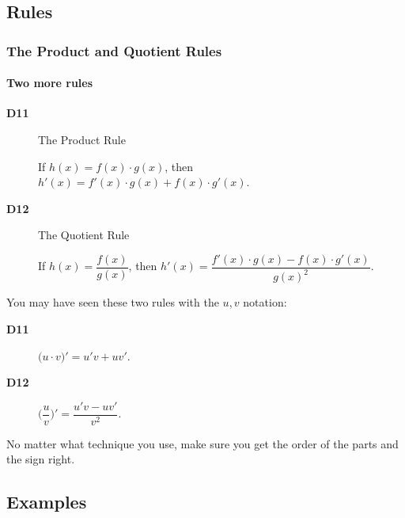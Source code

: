 \documentclass[9pt,xcolor=x11names,compress]{beamer}
\begin{document}
\subsection{Rules}
\begin{frame}\frametitle{The Product and Quotient Rules}
\framesubtitle{Two more rules}
\begin{description}
\item[\textbf{D11}] \alert{The Product Rule}

If $h(x)=f(x)\cdot g(x)$, then $h'(x)=f'(x)\cdot g(x) + f(x)\cdot g'(x)$.
\item[\textbf{D12}] \alert{The Quotient Rule} 

If $h(x)=\dfrac{f(x)}{g(x)}$, then $h'(x)=\dfrac{f'(x)\cdot g(x) - f(x)\cdot g'(x)}{g(x)^2}$.
\end{description}
\pause You may have seen these two rules with the $u,v$ notation:
\begin{description}
	\item[\textbf{D11}] $\big( u\cdot v \big)' = u' v + u v'$.
	\item[\textbf{D12}] $\Big( \dfrac{u}{v} \Big)' = \dfrac{u'v-uv'}{v^2}$.
\end{description}
\pause No matter what technique you use, make sure you get the order of the parts and the sign right.
\end{frame}

\subsection{Examples}
\end{document}
